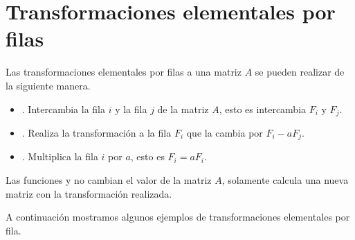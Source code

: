 
\section{Transformaciones elementales por filas}

Las transformaciones elementales por filas a una matriz $A$
se pueden realizar de la siguiente manera.
\begin{itemize}
 \item {}. Intercambia la fila $i$ y
  la fila $j$ de la matriz $A$, esto es intercambia $F_i$ y
  $F_j$.
 \item {}. Realiza la transformación
  a la fila $F_i$ que la cambia por $F_i-aF_j$.
 \item {}. Multiplica la fila $i$ por $a$,
  esto es $F_i = aF_i$.
\end{itemize}

Las funciones  y  no cambian
el valor de la matriz $A$, solamente calcula una nueva matriz
con la transformación realizada.

A continuación mostramos algunos ejemplos de transformaciones
elementales por fila.

